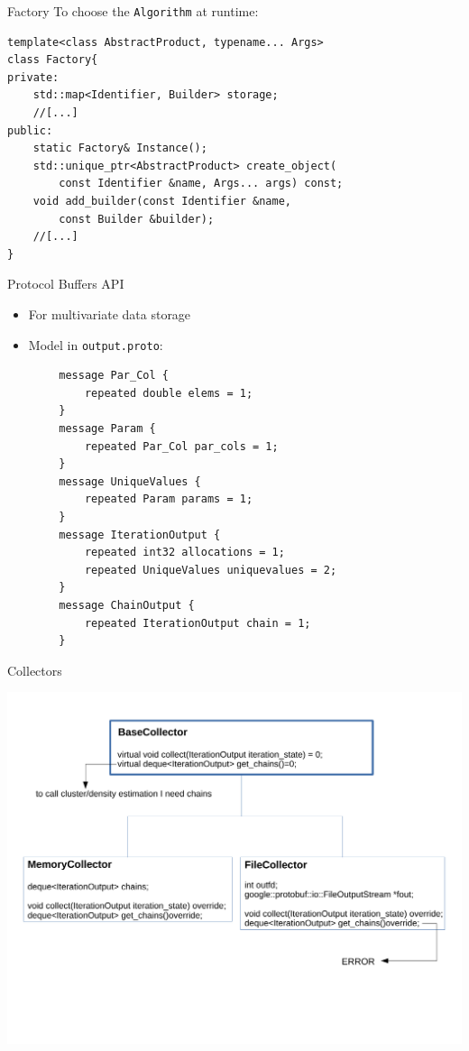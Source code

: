 \begin{frame}[fragile]{Factory}
To choose the \verb|Algorithm| at runtime:
\begin{verbatim}
template<class AbstractProduct, typename... Args>
class Factory{
private:
    std::map<Identifier, Builder> storage;
    //[...]
public:
    static Factory& Instance();
    std::unique_ptr<AbstractProduct> create_object(
        const Identifier &name, Args... args) const;
    void add_builder(const Identifier &name,
        const Builder &builder);
    //[...]
}
\end{verbatim}
\end{frame}


\begin{frame}[fragile] {Protocol Buffers API}
\begin{itemize}
	\item For multivariate data storage
	\item Model in \texttt{output.proto}:
\end{itemize}
\begin{small}
\begin{verbatim}
        message Par_Col {
            repeated double elems = 1;
        }
        message Param {
            repeated Par_Col par_cols = 1;
        }
        message UniqueValues {
            repeated Param params = 1;
        }
        message IterationOutput {
            repeated int32 allocations = 1;
            repeated UniqueValues uniquevalues = 2;
        }
        message ChainOutput {
            repeated IterationOutput chain = 1;
        }
\end{verbatim}
\end{small}
\end{frame}


\begin{frame}{Collectors}
	\begin{center}
		\includegraphics[scale=0.35]{etc/collectors.pdf}
	\end{center}
\end{frame}
